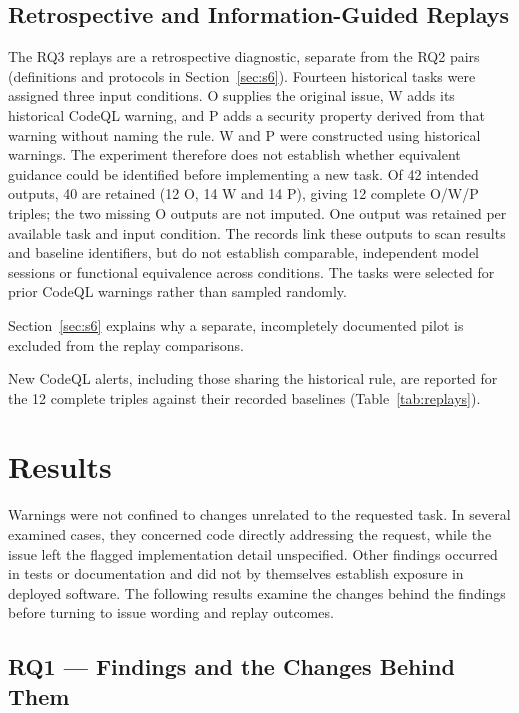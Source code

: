 \documentclass[acmsmall,screen,nonacm]{acmart}
\begin{document}
\subsection{Retrospective and Information-Guided Replays}\label{sec:rq3-design}

The RQ3 replays are a retrospective diagnostic, separate from the RQ2 pairs (definitions and protocols in Section~\ref{sec:s6}). Fourteen historical tasks were assigned three input conditions. O supplies the original issue, W adds its historical CodeQL warning, and P adds a security property derived from that warning without naming the rule. W and P were constructed using historical warnings. The experiment therefore does not establish whether equivalent guidance could be identified before implementing a new task. Of 42 intended outputs, 40 are retained (12 O, 14 W and 14 P), giving 12 complete O/W/P triples; the two missing O outputs are not imputed. One output was retained per available task and input condition. The records link these outputs to scan results and baseline identifiers, but do not establish comparable, independent model sessions or functional equivalence across conditions. The tasks were selected for prior CodeQL warnings rather than sampled randomly.

Section~\ref{sec:s6} explains why a separate, incompletely documented pilot is excluded from the replay comparisons.

New CodeQL alerts, including those sharing the historical rule, are reported for the 12 complete triples against their recorded baselines (Table~\ref{tab:replays}). 

\section{Results}

Warnings were not confined to changes unrelated to the requested task. In several examined cases, they concerned code directly addressing the request, while the issue left the flagged implementation detail unspecified. Other findings occurred in tests or documentation and did not by themselves establish exposure in deployed software. The following results examine the changes behind the findings before turning to issue wording and replay outcomes.

\subsection{RQ1 --- Findings and the Changes Behind Them}\label{sec:rq1-roles}
\end{document}
